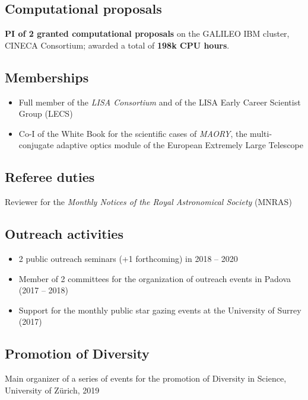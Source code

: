 \subsection*{{Computational proposals}}
\textbf{PI of 2 granted computational proposals} on the GALILEO IBM cluster, CINECA Consortium; awarded a total of \textbf{198k CPU hours}.

\subsection*{{Memberships}}
\begin{itemize}[leftmargin=3.5mm]
\setlength\itemsep{-2pt}
\item Full member of the \textit{{LISA Consortium}} and of the LISA Early Career Scientist Group (LECS)
\item Co-I of the White Book for the scientific cases of  \textit{MAORY}, the multi-conjugate adaptive optics module of the European Extremely Large Telescope
\end{itemize}



\subsection*{{Referee duties}}
Reviewer for the {\it Monthly Notices of the Royal Astronomical Society} (MNRAS)


\subsection*{{Outreach activities}}
\begin{itemize}[leftmargin=3.5mm]
\setlength\itemsep{-2pt}

\item 2 public outreach seminars (+1 forthcoming) in 2018 -- 2020

\item Member of 2 committees for the organization of outreach events in Padova (2017 -- 2018)

\item Support for the monthly public star gazing events at the University of Surrey (2017)
\end{itemize}


\subsection*{{Promotion of Diversity}}

Main organizer of a series of events for the {promotion of Diversity in Science}, University of Z\"urich, 2019